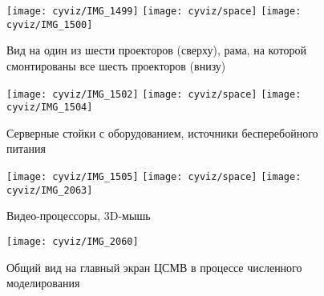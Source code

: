 \begin{figure}
\begin{center}
	\texttt{[image: cyviz/IMG\_1499]}
	\texttt{[image: cyviz/space]}
	\texttt{[image: cyviz/IMG\_1500]}
	\caption{Вид на один из шести проекторов (сверху), 
	рама, на которой смонтированы все шесть проекторов (внизу)}
\end{center}
\end{figure}

\begin{figure}
\begin{center}
	\texttt{[image: cyviz/IMG\_1502]}
	\texttt{[image: cyviz/space]}
	\texttt{[image: cyviz/IMG\_1504]}
	\caption{Серверные стойки с оборудованием, источники бесперебойного питания}
\end{center}
\end{figure}


\begin{figure}
\begin{center}
	\texttt{[image: cyviz/IMG\_1505]}
	\texttt{[image: cyviz/space]}
	\texttt{[image: cyviz/IMG\_2063]}
	\caption{Видео-процессоры, 3D-мышь}
\end{center}
\end{figure}

\begin{sidewaysfigure}
	\texttt{[image: cyviz/IMG\_2060]}
	\caption{Общий вид на главный экран ЦСМВ в процессе численного моделирования}
\end{sidewaysfigure}

